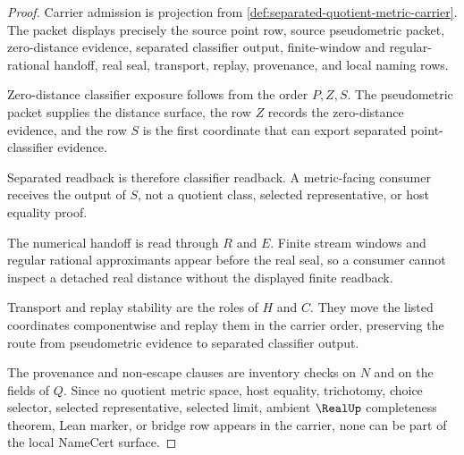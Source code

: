 \begin{proof}
Carrier admission is projection from \autoref{def:separated-quotient-metric-carrier}. The packet displays precisely the source point row, source pseudometric packet, zero-distance evidence, separated classifier output, finite-window and regular-rational handoff, real seal, transport, replay, provenance, and local naming rows.

Zero-distance classifier exposure follows from the order $P,Z,S$. The pseudometric packet supplies the distance surface, the row $Z$ records the zero-distance evidence, and the row $S$ is the first coordinate that can export separated point-classifier evidence.

Separated readback is therefore classifier readback. A metric-facing consumer receives the output of $S$, not a quotient class, selected representative, or host equality proof.

The numerical handoff is read through $R$ and $E$. Finite stream windows and regular rational approximants appear before the real seal, so a consumer cannot inspect a detached real distance without the displayed finite readback.

Transport and replay stability are the roles of $H$ and $C$. They move the listed coordinates componentwise and replay them in the carrier order, preserving the route from pseudometric evidence to separated classifier output.

The provenance and non-escape clauses are inventory checks on $N$ and on the fields of $Q$. Since no quotient metric space, host equality, trichotomy, choice selector, selected representative, selected limit, ambient $\RealUp$ completeness theorem, Lean marker, or bridge row appears in the carrier, none can be part of the local NameCert surface.
\end{proof}

